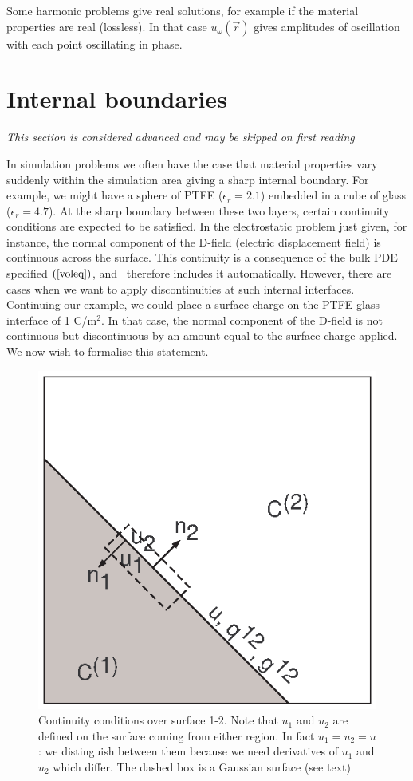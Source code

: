 \documentclass[a4paper,twoside,11pt]{book}
\begin{document}
Some harmonic problems give real solutions, for example if
the material properties are real (lossless). In that case
$u_\omega(\vec r)$ gives amplitudes of oscillation with each point
oscillating in phase.

\section{Internal boundaries}

\emph{This section is considered advanced and may be skipped on first reading}

In simulation problems we often have the case that material properties
vary suddenly within the simulation area giving a sharp internal
boundary. For example, we might have a sphere of PTFE
($\epsilon_r=2.1$) embedded in a cube of glass ($\epsilon_r=4.7$). At
the sharp boundary between these two layers, certain continuity
conditions are expected to be satisfied. In the electrostatic problem
just given, for instance, the normal component of the D-field
(electric displacement field) is continuous across the surface. This
continuity is a consequence of the bulk PDE specified $\eq{voleq}$,
and \zinc\ therefore includes it automatically. However, there are
cases when we want to apply discontinuities at such internal
interfaces. Continuing our example, we could place a surface charge on
the PTFE-glass interface of 1 C/m$^2$. In that case, the normal
component of the D-field is not continuous but discontinuous by an
amount equal to the surface charge applied. We now wish to formalise
this statement.

\begin{figure}
  \includegraphics{continuity}
  \caption{Continuity conditions over surface 1-2. Note that $u_1$ and
    $u_2$ are defined on the surface coming from either region. In
    fact $u_1=u_2=u$: we distinguish between them because we need
    derivatives of $u_1$ and $u_2$ which differ. The dashed box is a
    Gaussian surface (see text)}
  \label{contpic}
\end{figure}
\end{document}
